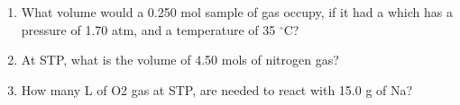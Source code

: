 \documentclass[main.tex]{subfiles}
\begin{document}
\begin{fullwidth}
\begin{multicols*}{2}
\begin{enumerate}
\item  What volume would a 0.250 mol sample of   gas occupy, if it had a which has a pressure of 1.70 atm, and a temperature of 35 $^{\circ}$C?
\begin{enumerate}[label=(\alph*)]\vspace{-0.5cm}
\end{enumerate}\vspace{-0.5cm}

\item   At STP, what is the volume of 4.50 mols of nitrogen gas?
\begin{enumerate}[label=(\alph*)]\vspace{-0.5cm}
\end{enumerate}\vspace{-0.5cm}

\item  How many L of O2 gas at STP, are needed to react with 15.0 g of Na?
\begin{center}\end{center}
\begin{enumerate}[label=(\alph*)]\vspace{-0.5cm}
\end{enumerate}\vspace{-0.5cm}


\end{enumerate}
\end{multicols*}
\end{fullwidth}
\end{document}
